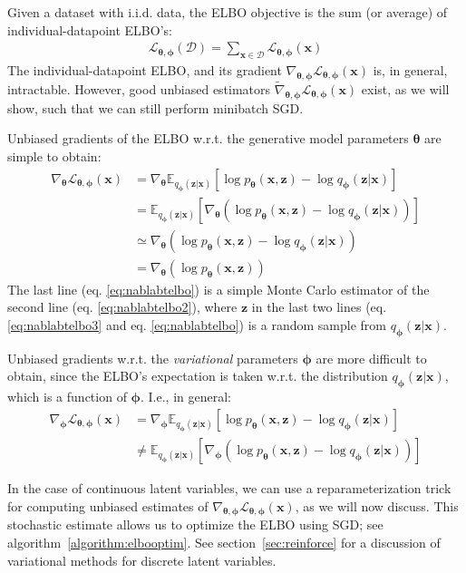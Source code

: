 \documentclass[MAL,biber]{nowfnt} %
\newcommand{\bb}[1]{\mathbf{#1}}
\newcommand{\bx}{\bb{x}}
\newcommand{\bz}{\bb{z}}
\newcommand{\bT}{\boldsymbol{\theta}}
\newcommand{\bphi}{\boldsymbol{\phi}}
\newcommand{\pT}{p_{\bT}}
\newcommand{\qP}{q_{\bphi}}
\newcommand{\Exp}[2]{\mathbb{E}_{#1}\left[#2\right]}
\newcommand{\ELBO}{\mathcal{L}_{\bT,\bphi}}
\begin{document}
Given a dataset with i.i.d. data, the ELBO objective is the sum (or average) of individual-datapoint ELBO's:
\begin{align}
\ELBO(\mathcal{D}) = \sum_{\bx \in \mathcal{D}} \ELBO(\bx)
\end{align}
The individual-datapoint ELBO, and its gradient $\nabla_{\bT,\bphi} \ELBO(\bx)$ is, in general, intractable. However, good unbiased estimators $\tilde{\nabla}_{\bT,\bphi} \ELBO(\bx)$ exist, as we will show, such that we can still perform minibatch SGD.


Unbiased gradients of the ELBO w.r.t. the generative model parameters $\bT$ are simple to obtain:
\begin{align}
\nabla_{\bT} \ELBO(\bx) &= \nabla_{\bT} \Exp{\qP(\bz|\bx)}{ \log \pT(\bx,\bz) - \log \qP(\bz|\bx) }\\
&= \Exp{\qP(\bz|\bx)}{\nabla_{\bT}( \log \pT(\bx,\bz) - \log \qP(\bz|\bx)) }
\label{eq:nablabtelbo2}\\
&\simeq \nabla_{\bT}( \log \pT(\bx,\bz) - \log \qP(\bz|\bx))\label{eq:nablabtelbo3}\\
&= \nabla_{\bT}( \log \pT(\bx,\bz))\label{eq:nablabtelbo}
\end{align}
The last line (eq. \eqref{eq:nablabtelbo}) is a simple Monte Carlo estimator of the second line (eq. \eqref{eq:nablabtelbo2}), where $\bz$ in the last two lines (eq. \eqref{eq:nablabtelbo3} and eq. \eqref{eq:nablabtelbo}) is a random sample from $\qP(\bz|\bx)$.

Unbiased gradients w.r.t. the \emph{variational} parameters $\bphi$ are more difficult to obtain, since the ELBO's expectation is taken w.r.t. the distribution $\qP(\bz|\bx)$, which is a function of $\bphi$. I.e., in general:
\begin{align}
\nabla_{\bphi} \ELBO(\bx) &= \nabla_{\bphi} \Exp{\qP(\bz|\bx)}{ \log \pT(\bx,\bz) - \log \qP(\bz|\bx) }\\
&\neq \Exp{\qP(\bz|\bx)}{\nabla_{\bphi}( \log \pT(\bx,\bz) - \log \qP(\bz|\bx)) }\end{align}

In the case of continuous latent variables, we can use a reparameterization trick for computing unbiased estimates of $\nabla_{\bT,\bphi} \ELBO(\bx)$, as we will now discuss. This stochastic estimate allows us to optimize the ELBO using SGD; see algorithm~\ref{algorithm:elbooptim}. See section~\ref{sec:reinforce} for a discussion of variational methods for discrete latent variables.
\end{document}

